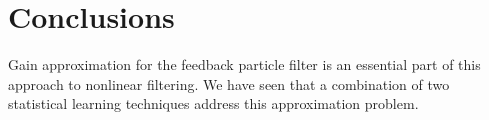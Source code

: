 %
%
%
%
%

\section{Conclusions}
\label{s:ch4_conclusions}

Gain approximation for the feedback particle filter is an essential part of this approach to nonlinear filtering.  We have seen that a combination of two statistical learning techniques address this approximation problem.

